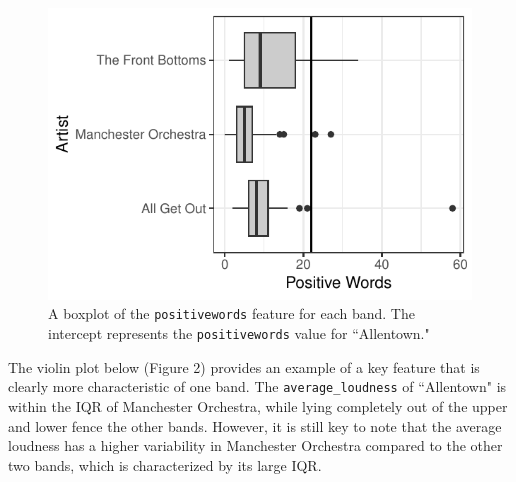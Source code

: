 \documentclass{article}\usepackage[]{graphicx}\usepackage[]{xcolor}
\makeatletter
\def\maxwidth{ %
  \ifdim\Gin@nat@width>\linewidth
    \linewidth
  \else
    \Gin@nat@width
  \fi
}
\newenvironment{knitrout}{}{} %
\makeatother
\begin{document}
\begin{multicols}{2}
 \begin{figure}[H]
\begin{knitrout}
\color{fgcolor}
\includegraphics[width=\maxwidth]{figure/unnamed-chunk-1-1} 
\end{knitrout}
 \caption{A boxplot of the \texttt{positivewords} feature for each band. The intercept represents the \texttt{positivewords} value for ``Allentown."}
 \label{plot1} %
 \end{figure}
\indent The violin plot below (Figure 2) provides an example of a key feature that is clearly more characteristic of one band. The \verb|average_loudness| of ``Allentown" is within the IQR of Manchester Orchestra, while lying completely out of the upper and lower fence the other bands. However, it is still key to note that the average loudness has a higher variability in Manchester Orchestra compared to the other two bands, which is characterized by its large IQR. \\
\begin{figure}[H]
\begin{knitrout}
\color{fgcolor}

\end{knitrout}
\end{figure}
\end{multicols}
\end{document}
